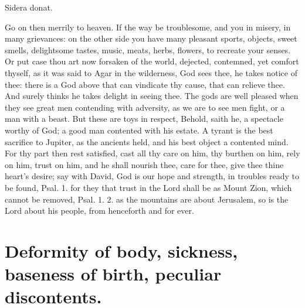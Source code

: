 {Sidera donat.

Go on then merrily to heaven. If the way be troublesome, and you in
misery, in many grievances: on the other side you have many pleasant
sports, objects, sweet smells, delightsome tastes, music, meats, herbs,
flowers, \etc{} to recreate your senses. Or put case thou art now forsaken
of the world, dejected, contemned, yet comfort thyself, as it was said
to Agar in the wilderness, God sees thee, he takes notice of
thee: there is a God above that can vindicate thy cause, that can
relieve thee. And surely \Seneca thinks he takes delight in seeing
thee. The gods are well pleased when they see great men contending with
adversity, as we are to see men fight, or a man with a beast. But these
are toys in respect,  Behold, saith he, a spectacle worthy of
God; a good man contented with his estate. A tyrant is the best
sacrifice to Jupiter, as the ancients held, and his best object a
contented mind. For thy part then rest satisfied, cast all thy care on
him, thy burthen on him, rely on him, trust on him, and he shall
nourish thee, care for thee, give thee thine heart's desire; say with
David, God is our hope and strength, in troubles ready to be found,
Psal.  1. for they that trust in the Lord shall be as Mount Zion,
which cannot be removed, Psal.  1. 2. as the mountains are about
Jerusalem, so is the Lord about his people, from henceforth and for
ever.


\section{Deformity of body, sickness, baseness of birth, peculiar discontents.}

}
